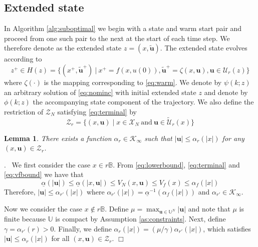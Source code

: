 \documentclass{article}
\newtheorem{lemma}{Lemma}
\newenvironment{proof}{\noindent {\em Proof}.\ }{\hspace*{\fill}$\Box$\medskip\\}
\newcommand{\abs}[1]{\left\lvert #1 \right\rvert}
\begin{document}
\subsection{Extended state}
In Algorithm \ref{alg:suboptimal} we begin with a state and warm start pair
and proceed from one such pair to the next at the start of each time step. 
We therefore denote as the extended state $z = (x,\tilde{\mathbf{u}})$.
The extended state evolves according to
\begin{equation}
\label{eq:nominc}
z^+ \in H(z) = \{(x^+,\tilde{\mathbf{u}}^+) \ | \ x^+ = f(x,u(0)), \tilde{\mathbf{u}}^+ = \zeta(x,\mathbf{u}), 
\mathbf{u} \in \mathcal{U}_r(z)\}
\end{equation}
where $\zeta(\cdot)$ is the mapping corresponding to \eqref{eq:warm}. 
We denote by $\psi(k;z)$ an arbitrary solution of 
\eqref{eq:nominc} with initial extended state $z$ and denote by $\phi(k;z)$ the accompanying state 
component of the trajectory.
We also define the restriction of $\mathcal{Z}_N$ satisfying \eqref{eq:terminal} by
\begin{equation*}
\mathcal{Z}_r = \{(x,\mathbf{u}) \mid x \in \mathcal{X}_N \ \text{and} \
\mathbf{u} \in \tilde{\mathcal{U}}_r(x)\}
\end{equation*}
\begin{lemma}
\label{lem:utox}
There exists a function $\alpha_r \in \mathcal{K}_\infty$ such that
$\abs{\mathbf{u}} \leq \alpha_r(\abs{x})$ for any $(x,\mathbf{u}) \in 
\mathcal{Z}_r$.
\end{lemma}
\begin{proof}
We first consider the case $x \in r\mathbb{B}$. From 
\eqref{eq:lowerbound}, \eqref{eq:terminal} and \eqref{eq:vfbound} we have that
\begin{equation*}
\underline{\alpha}(\abs{\mathbf{u}}) \leq \underline{\alpha}(\abs{x,\mathbf{u}}) \leq
V_N(x,\mathbf{u}) \leq V_f(x) \leq \alpha_f(\abs{x})
\end{equation*}
Therefore, $\abs{\mathbf{u}} \leq \alpha_{r'}(\abs{x})$ where
$\alpha_{r'}(\abs{x}) = \underline{\alpha}^{-1}(\alpha_f(\abs{x}))$ and $\alpha_{r'} \in \mathcal{K}_\infty$. 

Now we consider the case $x \notin r\mathbb{B}$. Define
$\mu = \max_{\mathbf{u} \in \mathbb{U}^N}\abs{\mathbf{u}}$ and note that $\mu$ is
finite because $\mathbb{U}$ is compact by Assumption \ref{as:constraints}. Next, define 
$\gamma = \alpha_{r'}(r) > 0$. Finally, we define
$\alpha_r(\abs{x}) = (\mu/\gamma)\alpha_{r'}(\abs{x})$, which satisfies 
$\abs{\mathbf{u}} \leq \alpha_r(\abs{x})$ for all $(x,\mathbf{u}) \in \mathcal{Z}_r$.
\end{proof}
\end{document}
